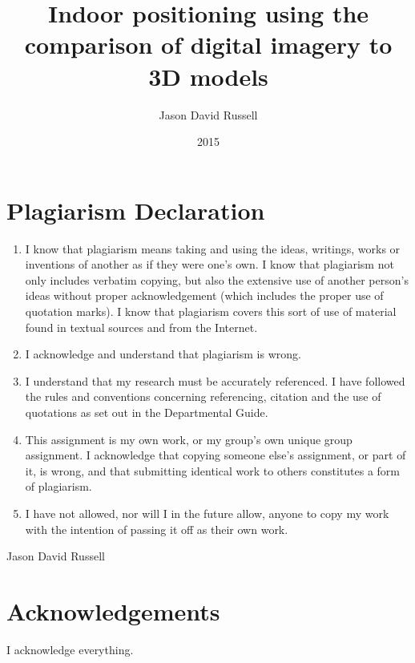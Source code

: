 \documentclass[11pt,a4paper]{report}
\title{Indoor positioning using the comparison of digital imagery to 3D models}
\date{2015}
\author{Jason David Russell}
\begin{document}
\maketitle
\thispagestyle{empty}

\setcounter{page}{1}

\newpage
\chapter*{Plagiarism Declaration}
	\begin{enumerate}
		\item
			I know that plagiarism means taking and using the ideas, writings, works or inventions of another as if they were one's own. I know that plagiarism not only includes verbatim copying, but also the extensive use of another person's ideas without proper acknowledgement (which includes the proper use of quotation marks). I know that plagiarism covers this sort of use of material found in textual sources and from the Internet.
		\item
			I acknowledge and understand that plagiarism is wrong.
		\item
			I understand that my research must be accurately referenced. I have followed the rules and conventions concerning referencing, citation and the use of quotations as set out in the Departmental Guide.
		\item
			This assignment is my own work, or my group's own unique group assignment.
			I acknowledge that copying someone else's assignment, or part of it, is wrong, and that submitting identical work to others constitutes a form of plagiarism.
		\item
			I have not allowed, nor will I in the future allow, anyone to copy my work with the intention of passing it off as their own work.
	\end{enumerate}
	Jason David Russell

\newpage
\chapter*{Acknowledgements}
	I acknowledge everything.

\newpage
\end{document}
